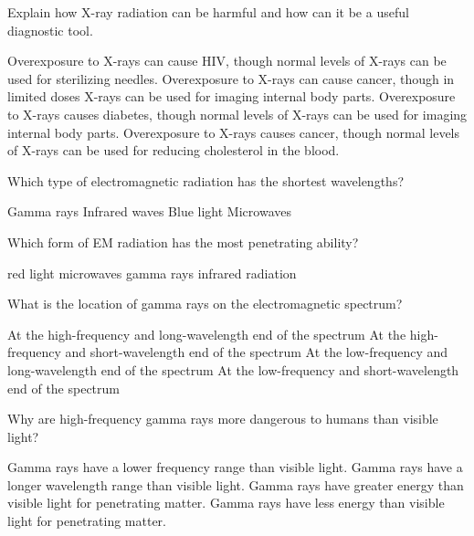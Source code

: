 \documentclass{exam}
\begin{document}
\begin{questions}
\question %
Explain how X-ray radiation can be harmful and how can it be a useful diagnostic tool.

\begin{choices}
\choice Overexposure to X-rays can cause HIV, though normal levels of X-rays can be used for sterilizing needles.
\CorrectChoice Overexposure to X-rays can cause cancer, though in limited doses X-rays can be used for imaging internal body parts.
\choice Overexposure to X-rays causes diabetes, though normal levels of X-rays can be used for imaging internal body parts.
\choice Overexposure to X-rays causes cancer, though normal levels of X-rays can be used for reducing cholesterol in the blood.
\end{choices}

\question %
Which type of electromagnetic radiation has the shortest wavelengths?

\begin{choices}
\CorrectChoice Gamma rays
\choice Infrared waves
\choice Blue light
\choice Microwaves
\end{choices}

\question %
Which form of EM radiation has the most penetrating ability?

\begin{choices}
\choice red light
\choice microwaves
\choice gamma rays
\choice infrared radiation
\end{choices}


\question %
What is the location of gamma rays on the electromagnetic spectrum?

\begin{choices}
\choice At the high-frequency and long-wavelength end of the spectrum
\CorrectChoice At the high-frequency and short-wavelength end of the spectrum
\choice At the low-frequency and long-wavelength end of the spectrum
\choice At the low-frequency and short-wavelength end of the spectrum
\end{choices}

\question %
Why are high-frequency gamma rays more dangerous to humans than visible light?

\begin{choices}
\choice Gamma rays have a lower frequency range than visible light.
\choice Gamma rays have a longer wavelength range than visible light.
\CorrectChoice Gamma rays have greater energy than visible light for penetrating matter.
\choice Gamma rays have less energy than visible light for penetrating matter.
\end{choices}




\end{questions}
\end{document}

